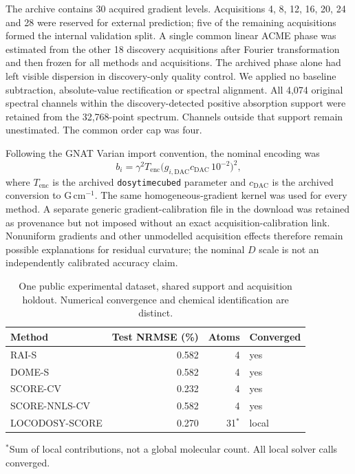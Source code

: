 The archive contains 30 acquired gradient levels. Acquisitions
4, 8, 12, 16, 20, 24 and 28 were reserved for external prediction;
five of the remaining acquisitions formed the internal validation split.
A single common linear ACME phase\cite{acme} was estimated from the other
18 discovery acquisitions after Fourier transformation and then frozen for
all methods and acquisitions. The archived phase alone had left visible
dispersion in discovery-only quality control. We applied no baseline
subtraction, absolute-value rectification or spectral alignment.
All 4,074 original spectral channels within the discovery-detected positive
absorption support were retained from the 32,768-point spectrum. Channels
outside that support remain unestimated. The common order cap was four.

Following the GNAT Varian import convention, the nominal encoding was
\begin{equation}
b_i=\gamma^2 T_{\mathrm{enc}}
 \bigl(g_{i,\mathrm{DAC}}c_{\mathrm{DAC}}\,10^{-2}\bigr)^2,
\end{equation}
where $T_{\mathrm{enc}}$ is the archived \texttt{dosytimecubed} parameter and
$c_{\mathrm{DAC}}$ is the archived conversion to G\,cm$^{-1}$.
The same homogeneous-gradient kernel was used for every method.
A separate generic gradient-calibration file in the download was retained
as provenance but not imposed without an exact acquisition-calibration link.
Nonuniform gradients and other unmodelled acquisition effects therefore
remain possible explanations for residual curvature; the nominal $D$ scale
is not an independently calibrated accuracy claim.

\begin{table}[ht]
\caption{One public experimental dataset, shared support and acquisition
holdout. Numerical convergence and chemical identification are distinct.}
\label{tab:publicmixturerevision}
\centering\small
\begin{tabular}{lrrl}\toprule
Method & Test NRMSE (\%) & Atoms & Converged \\ \midrule
RAI-S & 0.582 & 4 & yes \\
DOME-S & 0.582 & 4 & yes \\
SCORE-CV & 0.232 & 4 & yes \\
SCORE-NNLS-CV & 0.582 & 4 & yes \\
LOCODOSY-SCORE & 0.270 & 31$^{*}$ & local \\
\bottomrule\end{tabular}
\par\smallskip\footnotesize $^{*}$Sum of local contributions, not a global
molecular count. All local solver calls converged.
\end{table}

